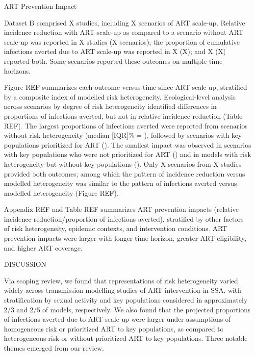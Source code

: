ART Prevention Impact

Dataset B comprised X studies,
including X scenarios of ART scale-up.
Relative incidence reduction with ART scale-up
as compared to a scenario without ART scale-up
was reported in X studies (X scenarios);
the proportion of cumulative infections averted due to ART scale-up
was reported in X (X);
and X (X) reported both.
Some scenarios reported these outcomes on multiple time horizons.

Figure REF summarizes each outcome versus time since ART scale-up,
stratified by a composite index of modelled risk heterogeneity.
Ecological-level analysis across scenarios by degree of risk heterogeneity
identified differences in proportions of infections averted,
but not in relative incidence reduction (Table REF).
The largest proportions of infections averted were reported from 
scenarios without risk heterogeneity (median [IQR]\% = ), followed by
scenarios with key populations prioritized for ART ().
The smallest impact was observed in scenarios with
key populations who were not prioritized for ART ()
and in models with risk heterogeneity but without key populations
().
Only X scenarios from X studies provided both outcomes; 
among which the pattern of incidence reduction versus modelled heterogeneity
was similar to the pattern of infections averted versus modelled heterogeneity
(Figure REF).

Appendix REF and Table REF summarizes
ART prevention impacts (relative incidence reduction/proportion of infections averted),
stratified by other factors of risk heterogeneity, epidemic contexts, and intervention conditions.
ART prevention impacts were larger with longer time horizon, greater ART eligibility, and higher ART coverage.

DISCUSSION

Via scoping review, we found that representations of risk heterogeneity varied widely across
transmission modelling studies of ART intervention in SSA, with
stratification by sexual activity and key populations considered in approximately
2/3 and 2/5 of models, respectively.
We also found that the projected proportions of infections averted due to ART scale-up were
larger under assumptions of homogeneous risk or prioritized ART to key populations,
as compared to heterogeneous risk or without prioritized ART to key populations.
Three notable themes emerged from our review.

